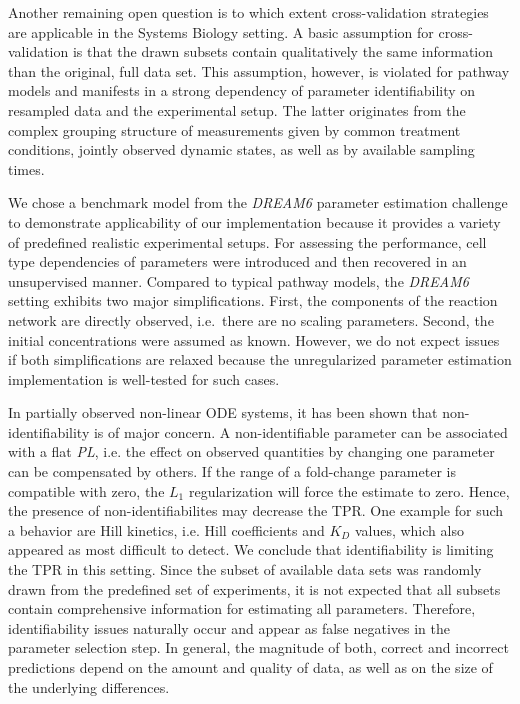 \documentclass{bioinfo}
\begin{document}

Another remaining open question is to which extent cross-validation strategies are applicable in the Systems Biology setting.
A basic assumption for cross-validation is that the drawn subsets contain qualitatively the same information than the original, full data set.
This assumption, however, is violated for pathway models and manifests in a strong dependency of parameter identifiability on resampled data and the experimental setup.
The latter originates from the complex grouping structure of measurements given by common treatment conditions, jointly observed dynamic states, as well as by available sampling times.



We chose a benchmark model from the \emph{DREAM6} parameter estimation challenge 
to demonstrate applicability of our implementation because it provides a variety of predefined realistic experimental setups.
For assessing the performance, cell type dependencies of parameters were introduced and then recovered in an unsupervised manner.
Compared to typical pathway models, the \emph{DREAM6} setting exhibits two major simplifications.
First, the components of the reaction network are directly observed, i.e.~there are no scaling parameters.
Second, the initial concentrations were assumed as known.
However, we do not expect issues if both simplifications are relaxed because the unregularized parameter estimation implementation is well-tested for such cases.

In partially observed non-linear ODE systems, it has been shown that non-identifiability is of major concern.
A non-identifiable parameter can be associated with a flat \emph{PL}, i.e. the effect on observed quantities by changing one parameter can be compensated by others.
If the range of a fold-change parameter is compatible with zero, the $L_1$ regularization will force the estimate to zero.
Hence, the presence of non-identifiabilites may decrease the TPR.
One example for such a behavior are Hill kinetics, i.e. Hill coefficients and $K_D$ values, which also appeared as most difficult to detect.
We conclude that identifiability is limiting the TPR in this setting.
Since the subset of available data sets was randomly drawn from the predefined set of experiments,
it is not expected that all subsets contain comprehensive information for estimating all parameters.
Therefore, identifiability issues naturally occur and appear as false negatives in the parameter selection step.
In general, the magnitude of both, correct and incorrect predictions depend on the amount and quality of data, as well as on the size of the underlying differences.
\end{document}
